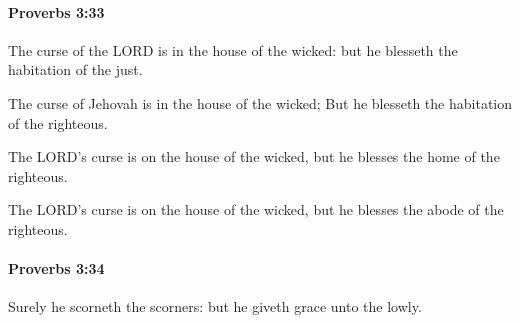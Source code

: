 		\paragraph{Proverbs 3:33} %
			\label{PROVERBS-3-33}

			The curse of the LORD is in the house of the wicked: but he blesseth the habitation of the just.

			\begin{versebox}
					\item[BHS] 
					\item[ASV] The curse of Jehovah is in the house of the wicked; But he blesseth the habitation of the righteous.
					\item[NIV] The LORD’s curse is on the house of the wicked, but he blesses the home of the righteous.
					\item[NRSV] The LORD’s curse is on the house of the wicked, but he blesses the abode of the righteous.
			\end{versebox}

		\paragraph{Proverbs 3:34} %
			\label{PROVERBS-3-34}

			Surely he scorneth the scorners: but he giveth grace unto the lowly.

